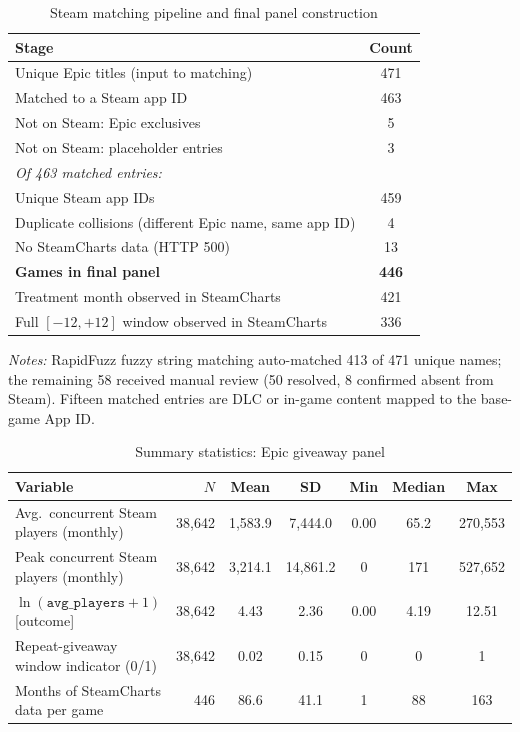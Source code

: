 \documentclass[11pt]{article}
\newcommand{\avgp}{\texttt{avg\_players}}
\begin{document}
\begin{singlespace}
\begin{table}[H]
\centering\small
\caption{Steam matching pipeline and final panel construction}
\label{tab:pipeline}
\begin{tabular}{lc}
\toprule
Stage & Count \\
\midrule
Unique Epic titles (input to matching) & 471 \\
\quad Matched to a Steam app ID & 463 \\
\quad Not on Steam: Epic exclusives & 5 \\
\quad Not on Steam: placeholder entries & 3 \\
\midrule
\multicolumn{2}{l}{\textit{Of 463 matched entries:}} \\
\quad Unique Steam app IDs & 459 \\
\quad Duplicate collisions (different Epic name, same app ID) & 4 \\
\midrule
No SteamCharts data (HTTP 500) & 13 \\
\textbf{Games in final panel} & \textbf{446} \\
\quad Treatment month observed in SteamCharts & 421 \\
\quad Full $[-12,+12]$ window observed in SteamCharts & 336 \\
\bottomrule
\end{tabular}
\medskip

\noindent\small\textit{Notes:} RapidFuzz fuzzy string matching auto-matched 413
of 471 unique names; the remaining 58 received manual review (50 resolved, 8
confirmed absent from Steam). Fifteen matched entries are DLC or in-game content
mapped to the base-game App ID.
\end{table}

\vspace{2em}

\begin{table}[H]
\centering\small
\caption{Summary statistics: Epic giveaway panel}
\label{tab:sumstats}
\begin{tabular}{lrccccc}
\toprule
Variable & $N$ & Mean & SD & Min & Median & Max \\
\midrule
Avg.\ concurrent Steam players (monthly) & 38,642 & 1,583.9 & 7,444.0 & 0.00 & 65.2 & 270,553 \\
Peak concurrent Steam players (monthly)  & 38,642 & 3,214.1 & 14,861.2 & 0 & 171 & 527,652 \\
$\ln(\avgp+1)$ [outcome] & 38,642 & 4.43 & 2.36 & 0.00 & 4.19 & 12.51 \\
Repeat-giveaway window indicator (0/1)   & 38,642 & 0.02 & 0.15 & 0 & 0 & 1 \\
\midrule
Months of SteamCharts data per game & 446 & 86.6 & 41.1 & 1 & 88 & 163 \\
\bottomrule
\end{tabular}
\medskip


\end{table}
\end{singlespace}
\end{document}
